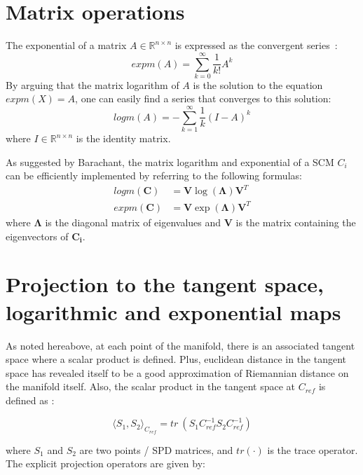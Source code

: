 \documentclass[a4paper,11pt]{report}
\begin{document}
\section{Matrix operations}

The exponential of a matrix $A \in \mathbb{R}^{n \times n}$ is expressed as the convergent series~\citep{doi:10.1137/S0895479803436937}:
\begin{equation}
  expm(A) = \sum\limits_{k=0}^{\infty} \frac{1}{k!} A^k
\end{equation}
By arguing that the matrix logarithm of $A$ is the solution to the equation $expm(X) = A$, one can easily find a series that converges to this solution:
\begin{equation}
  logm(A) = - \sum\limits_{k=1}^{\infty} \frac{1}{k} (I - A)^k
\end{equation}
\noindent where $I \in \mathbb{R}^{n \times n}$ is the identity matrix.

As suggested by Barachant, the matrix logarithm and exponential of a SCM $C_i$ can be efficiently implemented by referring to the following formulas:
\begin{align}
  logm(\mathbf{C}) & = \mathbf{V} \log{(\mathbf{\Lambda})} \mathbf{V}^T \\
  expm(\mathbf{C}) & = \mathbf{V} \exp{(\mathbf{\Lambda})} \mathbf{V}^T
\end{align}
\noindent where $\mathbf{\Lambda}$ is the diagonal matrix of eigenvalues
and $\mathbf{V}$ is the matrix containing the eigenvectors of $\mathbf{C_i}$.

\section{Projection to the tangent space, logarithmic and exponential maps}

As noted hereabove, at each point of the manifold, there is an associated tangent space where a scalar product is defined.
Plus, euclidean distance in the tangent space has revealed itself to be a good approximation of Riemannian distance
on the manifold itself. Also, the scalar product in the tangent space at $C_{ref}$ is defined as \citep{BARACHANT2013172}:

\begin{equation}
    \langle S_1, S_2 \rangle_{C_{ref}} = tr \ (S_1 C_{ref}^{-1} S_2 C_{ref}^{-1})
\end{equation}

\noindent where $S_1$ and $S_2$ are two points / SPD matrices, and $tr(\cdot)$ is the trace operator.
The explicit projection operators are given by:
\end{document}
